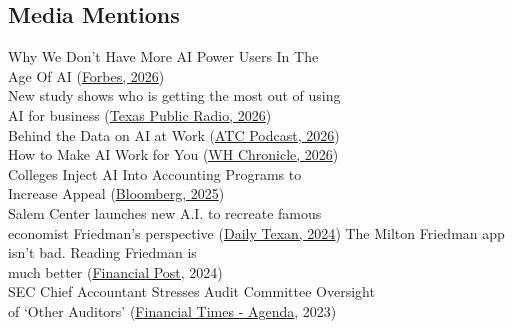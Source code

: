 \documentclass[]{deedy-resume-openfont}
\begin{document}
\begin{minipage}[t]{0.49\textwidth} 
\subsection{Media Mentions}

Why We Don’t Have More AI Power Users In The \\ \hspace*{.4cm} Age Of AI (\href{https://www.forbes.com/sites/joemckendrick/2026/03/22/why-we-dont-have-more-ai-power-users-in-the-age-of-ai/}{\underline{Forbes}, 2026}) \\
New study shows who is getting the most out of using \\ \hspace*{.4cm} AI for business (\href{https://www.tpr.org/news/2026-03-20/new-study-shows-who-is-getting-the-most-out-of-using-ai-for-business}{\underline{Texas Public Radio}, 2026}) \\
Behind the Data on AI at Work (\href{https://a7b1cb29-8eb2-4801-9ccb-e0eb899497ab.libsyn.com/behind-the-data-on-ai-at-work-with-dr-nick-hallman}{\underline{ATC Podcast}, 2026}) \\
How to Make AI Work for You (\href{https://whchronicle.com/episodes/how-to-make-ai-work-for-you/}{\underline{WH Chronicle}, 2026}) \\
Colleges Inject AI Into Accounting Programs to \\ \hspace*{.4cm} Increase Appeal (\href{https://news.bloombergtax.com/financial-accounting/colleges-inject-ai-into-accounting-programs-to-increase-appeal}{\underline{Bloomberg}, 2025}) \\
Salem Center launches new A.I. to recreate famous  \\ \hspace*{.4cm} economist Friedman’s perspective (\href{https://thedailytexan.com/2024/04/03/salem-center-launches-new-a-i-to-recreate-famous-economist-friedmans-perspective/}{\underline{Daily Texan}, 2024})
The Milton Friedman app isn't bad. Reading Friedman is \\ \hspace*{.4cm}much better (\href{https://financialpost.com/opinion/milton-friedman-app-isnt-bad-reading-friedman-much-better}{\underline{Financial Post}}, 2024) \\
SEC Chief Accountant Stresses Audit Committee Oversight  \\
\hspace*{.4cm} of ‘Other Auditors’ (\href{https://t.e2ma.net/click/qo491h/ejc7cb2/m9dsdw}{\underline{Financial Times - Agenda}}, 2023) \\

\end{minipage}
\end{document}
